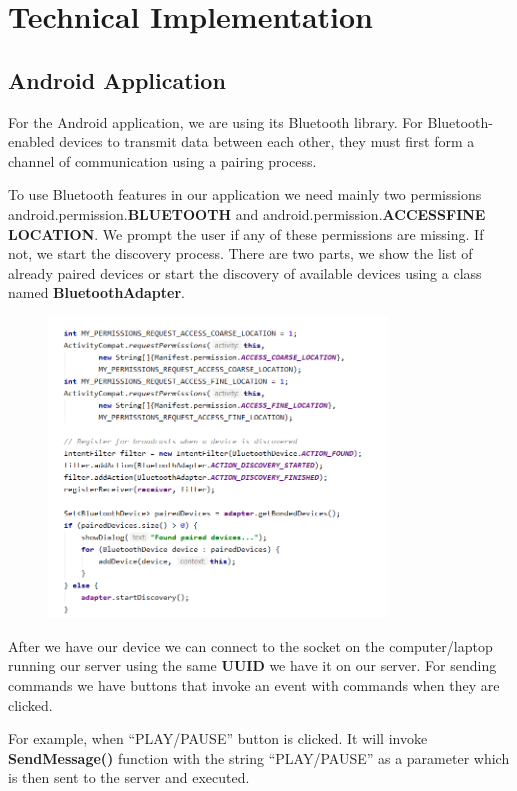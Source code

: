 \documentclass{article}
\begin{document}
\section{Technical Implementation}

\subsection{Android Application}

For the Android application, we are using its Bluetooth library. For Bluetooth-enabled devices to
transmit data between each other, they must first form a channel of communication using a pairing
process.

To use Bluetooth features in our application we need mainly two permissions
android.permission.\textbf{BLUETOOTH} and android.permission.\textbf{ACCESS\textunderscore FINE
\textunderscore LOCATION}. We prompt the user if any of these permissions are missing. If not, we
start the discovery process. There are two parts, we show the list of already paired devices or
start the discovery of available devices using a class named \textbf{BluetoothAdapter}.

\begin{figure}[ht]
\centering
\includegraphics[width=90mm]{./discoverDevice.png}
\end{figure}


After we have our device we can connect to the socket on the computer/laptop running our server
using the same \textbf{UUID} we have it on our server.  For sending commands we have buttons that
invoke an event with commands when they are clicked.

For example, when “PLAY/PAUSE” button is clicked. It will invoke \textbf{SendMessage()} function
with the string “PLAY/PAUSE” as a parameter which is then sent to the server and executed.
\end{document}
